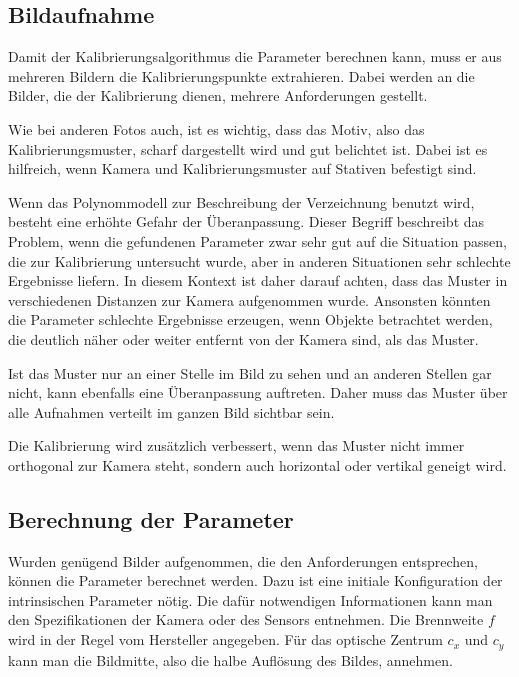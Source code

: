 \subsection{Bildaufnahme} %
\label{sub:bildaufnahme}
Damit der Kalibrierungsalgorithmus die Parameter berechnen kann, muss er aus mehreren Bildern die Kalibrierungspunkte extrahieren. Dabei werden an die Bilder, die der Kalibrierung dienen, mehrere Anforderungen gestellt. 

Wie bei anderen Fotos auch, ist es wichtig, dass das Motiv, also das Kalibrierungsmuster, scharf dargestellt wird und gut belichtet ist. Dabei ist es hilfreich, wenn Kamera und Kalibrierungsmuster auf Stativen befestigt sind. 

Wenn das Polynommodell zur Beschreibung der Verzeichnung benutzt wird, besteht eine erhöhte Gefahr der Überanpassung. Dieser Begriff beschreibt das Problem, wenn die gefundenen Parameter zwar sehr gut auf die Situation passen, die zur Kalibrierung untersucht wurde, aber in anderen Situationen sehr schlechte Ergebnisse liefern. In diesem Kontext ist daher darauf achten, dass das Muster in verschiedenen Distanzen zur Kamera aufgenommen wurde. Ansonsten könnten die Parameter schlechte Ergebnisse erzeugen, wenn Objekte betrachtet werden, die deutlich näher oder weiter entfernt von der Kamera sind, als das Muster.

Ist das Muster nur an einer Stelle im Bild zu sehen und an anderen Stellen gar nicht, kann ebenfalls eine Überanpassung auftreten. Daher muss das Muster über alle Aufnahmen verteilt im ganzen Bild sichtbar sein. 

Die Kalibrierung wird zusätzlich verbessert, wenn das Muster nicht immer orthogonal zur Kamera steht, sondern auch horizontal oder vertikal geneigt wird.

\subsection{Berechnung der Parameter} %
\label{sub:berechnung_der_parameter}
Wurden genügend Bilder aufgenommen, die den Anforderungen entsprechen, können die Parameter berechnet werden. Dazu ist eine initiale Konfiguration der intrinsischen Parameter nötig. Die dafür notwendigen Informationen kann man den Spezifikationen der Kamera oder des Sensors entnehmen. Die Brennweite $f$ wird in der Regel vom Hersteller angegeben. Für das optische Zentrum $c_x$ und $c_y$ kann man die Bildmitte, also die halbe Auflösung des Bildes, annehmen.

